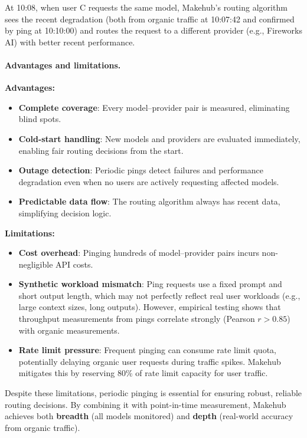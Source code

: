 \documentclass[english]{article}
\begin{document}
At 10:08, when user C requests the same model, Makehub's routing algorithm sees the recent degradation (both from organic traffic at 10:07:42 and confirmed by ping at 10:10:00) and routes the request to a different provider (e.g., Fireworks AI) with better recent performance.

\paragraph{Advantages and limitations.}

\textbf{Advantages:}
\begin{itemize}
    \item \textbf{Complete coverage}: Every model–provider pair is measured, eliminating blind spots.
    \item \textbf{Cold-start handling}: New models and providers are evaluated immediately, enabling fair routing decisions from the start.
    \item \textbf{Outage detection}: Periodic pings detect failures and performance degradation even when no users are actively requesting affected models.
    \item \textbf{Predictable data flow}: The routing algorithm always has recent data, simplifying decision logic.
\end{itemize}

\textbf{Limitations:}
\begin{itemize}
    \item \textbf{Cost overhead}: Pinging hundreds of model–provider pairs incurs non-negligible API costs.
    \item \textbf{Synthetic workload mismatch}: Ping requests use a fixed prompt and short output length, which may not perfectly reflect real user workloads (e.g., large context sizes, long outputs). However, empirical testing shows that throughput measurements from pings correlate strongly (Pearson $r > 0.85$) with organic measurements.
    \item \textbf{Rate limit pressure}: Frequent pinging can consume rate limit quota, potentially delaying organic user requests during traffic spikes. Makehub mitigates this by reserving 80\% of rate limit capacity for user traffic.
\end{itemize}

Despite these limitations, periodic pinging is essential for ensuring robust, reliable routing decisions. By combining it with point-in-time measurement, Makehub achieves both \textbf{breadth} (all models monitored) and \textbf{depth} (real-world accuracy from organic traffic).
\end{document}
